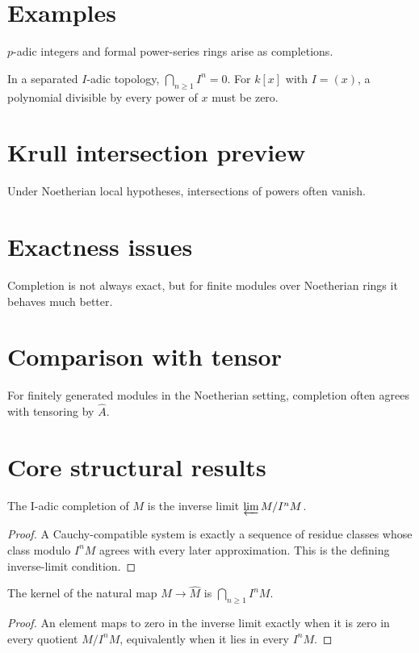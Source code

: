 \section{Examples}
$p$-adic integers and formal power-series rings arise as completions.

\begin{example}\label{ex:v18-expand-03}
In a separated $I$-adic topology, $\bigcap_{n\ge1}I^n=0$. For $k[x]$ with $I=(x)$, a polynomial divisible by every power of $x$ must be zero.
\end{example}
\section{Krull intersection preview}
Under Noetherian local hypotheses, intersections of powers often vanish.

\section{Exactness issues}
Completion is not always exact, but for finite modules over Noetherian rings it behaves much better.

\section{Comparison with tensor}
For finitely generated modules in the Noetherian setting, completion often agrees with tensoring by $\widehat A$.

\section{Core structural results}

\begin{theorem}\label{thm:v18-01}
The I-adic completion of $M$ is the inverse limit $\varprojlim M/I^nM$.
\begin{proof}
A Cauchy-compatible system is exactly a sequence of residue classes whose class modulo $I^nM$ agrees with every later approximation. This is the defining inverse-limit condition.
\end{proof}
\end{theorem}

\begin{theorem}\label{thm:v18-02}
The kernel of the natural map $M\to\widehat M$ is $\bigcap_{n\ge1}I^nM$.
\begin{proof}
An element maps to zero in the inverse limit exactly when it is zero in every quotient $M/I^nM$, equivalently when it lies in every $I^nM$.
\end{proof}
\end{theorem}

